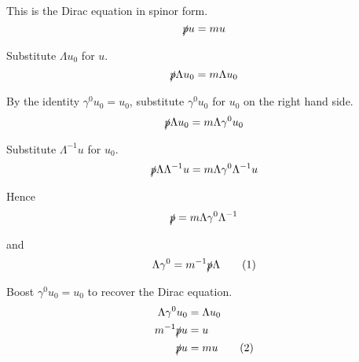 This is the Dirac equation in spinor form.
\begin{equation*}
\slashed pu=mu
\end{equation*}

Substitute $\Lambda u_0$ for $u$.
\begin{equation*}
\slashed p\Lambda u_0=m\Lambda u_0
\end{equation*}

By the identity $\gamma^0u_0=u_0$, substitute $\gamma^0u_0$ for $u_0$ on the right hand side.
\begin{equation*}
\slashed p\Lambda u_0=m\Lambda\gamma^0u_0
\end{equation*}

Substitute $\Lambda^{-1}u$ for $u_0$.
\begin{equation*}
\slashed p\Lambda\Lambda^{-1}u=m\Lambda\gamma^0\Lambda^{-1}u
\end{equation*}

Hence
\begin{equation*}
\slashed p=m\Lambda\gamma^0\Lambda^{-1}
\end{equation*}

and
\begin{equation*}
\Lambda\gamma^0=m^{-1}\slashed p\Lambda
\tag{1}
\end{equation*}

Boost $\gamma^0u_0=u_0$ to recover the Dirac equation.
\begin{align*}
\Lambda\gamma^0u_0&=\Lambda u_0
\\
m^{-1}\slashed pu&=u
\\
\slashed pu&=mu
\tag{2}
\end{align*}


